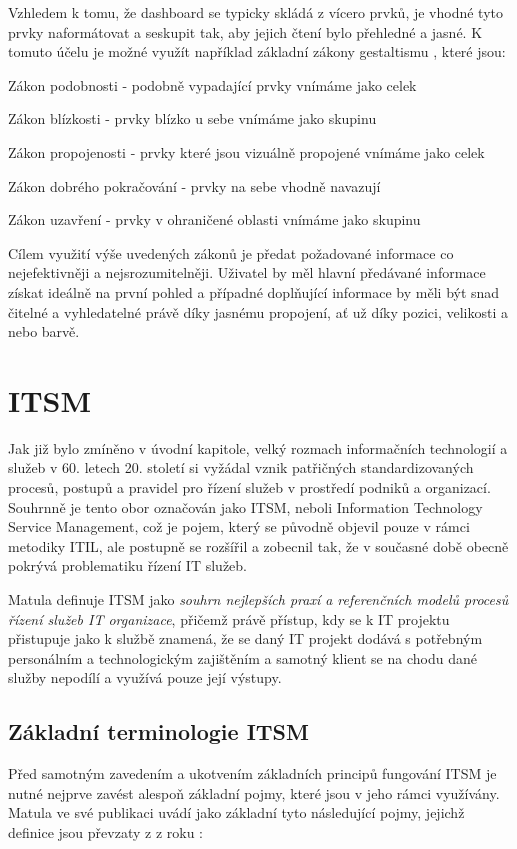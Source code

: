 \documentclass[
  digital,     %
  twoside,     %
  lof,         %
  lot,         %
]{fithesis4}
\begin{document}
Vzhledem k tomu, že dashboard se typicky skládá z vícero prvků, je vhodné tyto prvky naformátovat a seskupit tak, aby jejich čtení bylo přehledné a jasné. K tomuto účelu je možné využít například základní zákony gestaltismu \parencite[s.73]{Marek2015thesis}, které jsou:
\begin{compactitem}
    \item Zákon podobnosti - podobně vypadající prvky vnímáme jako celek
    \item Zákon blízkosti - prvky blízko u sebe vnímáme jako skupinu
    \item Zákon propojenosti - prvky které jsou vizuálně propojené vnímáme jako celek
    \item Zákon dobrého pokračování - prvky na sebe vhodně navazují
    \item Zákon uzavření - prvky v ohraničené oblasti vnímáme jako skupinu
\end{compactitem}  

Cílem využití výše uvedených zákonů je předat požadované informace co nejefektivněji a nejsrozumitelněji. Uživatel by měl hlavní předávané informace získat ideálně na první pohled a případné doplňující informace by měli být snad čitelné a vyhledatelné právě díky jasnému propojení, ať už díky pozici, velikosti a nebo barvě. 

\chapter{ITSM}
Jak již bylo zmíněno v úvodní kapitole, velký rozmach informačních technologií a služeb v 60. letech 20. století si vyžádal vznik patřičných standardizovaných procesů, postupů a pravidel pro řízení služeb v prostředí podniků a organizací. Souhrnně je tento obor označován jako ITSM, neboli Information Technology Service Management, což je pojem, který se původně objevil pouze v rámci metodiky ITIL, ale postupně se rozšířil a zobecnil tak, že v současné době obecně pokrývá problematiku řízení IT služeb.\parencite[s.~20]{Matula2017} 

Matula definuje ITSM jako \textit{souhrn nejlepších praxí a referenčních modelů procesů řízení služeb IT organizace}, přičemž právě přístup, kdy se k IT projektu přistupuje jako k službě znamená, že se daný IT projekt dodává s potřebným personálním a technologickým zajištěním a samotný klient se na chodu dané služby nepodílí a využívá pouze její výstupy.\parencite[s.~20-22]{Matula2017}

\section{Základní terminologie ITSM}
Před samotným zavedením a ukotvením základních principů fungování ITSM je nutné nejprve zavést alespoň základní pojmy, které jsou v jeho rámci využívány. Matula ve své publikaci  uvádí jako základní tyto následující pojmy, jejichž definice jsou převzaty z  z roku \citeyear{SyFvQA11lk1OaIec}:
\end{document}
